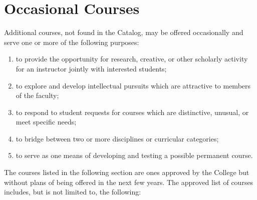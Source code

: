 \documentclass[
  letterpaper,
]{scrbook}
\providecommand{\tightlist}{%
  \setlength{\itemsep}{0pt}\setlength{\parskip}{0pt}}
\begin{document}
\section{Occasional Courses}\label{occasional-courses}

Additional courses, not found in the Catalog, may be offered
occasionally and serve one or more of the following purposes:

\begin{enumerate}
\def\labelenumi{\arabic{enumi}.}
\tightlist
\item
  to provide the opportunity for research, creative, or other scholarly
  activity for an instructor jointly with interested students;
\item
  to explore and develop intellectual pursuits which are attractive to
  members of the faculty;
\item
  to respond to student requests for courses which are distinctive,
  unusual, or meet specific needs;
\item
  to bridge between two or more disciplines or curricular categories;
\item
  to serve as one means of developing and testing a possible permanent
  course.
\end{enumerate}

The courses listed in the following section are ones approved by the
College but without plans of being offered in the next few years. The
approved list of courses includes, but is not limited to, the following:
\end{document}
